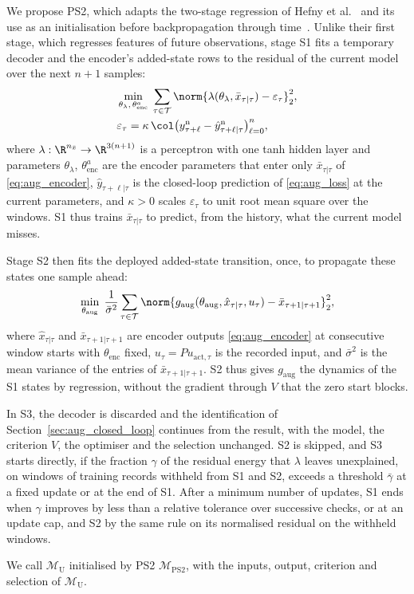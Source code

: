 We propose PS2, which adapts the two-stage regression of Hefny et
al.~\cite[Sec.~3]{hefny2015supervised} and its use as an initialisation before
backpropagation through time~\cite[Sec.~4.2]{downey2017psrnn}.
Unlike their first stage, which regresses features of future observations,
stage S1 fits a temporary decoder and the encoder's added-state rows to the
residual of the current model over the next $n+1$ samples:
\begin{equation}
\begin{aligned}
 &\min_{\theta_\lambda,\,\theta^{a}_{\mathrm{enc}}}\;
 \sum_{\tau\in\mathcal T}
 \norm{\lambda(\theta_\lambda,\bar x_{\tau|\tau})-\varepsilon_\tau}_2^2,\\
 &\varepsilon_\tau=\kappa\,\col\bigl(y^{\mathrm n}_{\tau+\ell}-\hat y^{\mathrm n}_{\tau+\ell|\tau}\bigr)_{\ell=0}^{n},
\end{aligned}
\label{eq:ps2_s1}
\end{equation}
where $\lambda:\R^{n_{\bar x}}\to\R^{3(n+1)}$ is a perceptron with one tanh
hidden layer and parameters $\theta_\lambda$, $\theta^{a}_{\mathrm{enc}}$ are
the encoder parameters that enter only $\bar x_{\tau|\tau}$ of
\eqref{eq:aug_encoder}, $\hat y_{\tau+\ell|\tau}$ is the closed-loop prediction
of \eqref{eq:aug_loss} at the current parameters, and $\kappa>0$ scales
$\varepsilon_\tau$ to unit root mean square over the windows.
S1 thus trains $\bar x_{\tau|\tau}$ to predict, from the history, what the
current model misses.

Stage S2 then fits the deployed added-state transition, once, to propagate
these states one sample ahead:
\begin{equation}
 \min_{\theta_{\mathrm{aug}}}\;\frac{1}{\bar\sigma^2}\sum_{\tau\in\mathcal T}
 \norm{g_{\mathrm{aug}}(\theta_{\mathrm{aug}},\hat x_{\tau|\tau},u_\tau)
 -\bar x_{\tau+1|\tau+1}}_2^2,
 \label{eq:ps2_s2}
\end{equation}
where $\hat x_{\tau|\tau}$ and $\bar x_{\tau+1|\tau+1}$ are encoder outputs
\eqref{eq:aug_encoder} at consecutive window starts with $\theta_{\mathrm{enc}}$
fixed, $u_\tau=Pu_{\mathrm{act},\tau}$ is the recorded input, and
$\bar\sigma^2$ is the mean variance of the entries of
$\bar x_{\tau+1|\tau+1}$.
S2 thus gives $g_{\mathrm{aug}}$ the dynamics of the S1 states by regression,
without the gradient through $V$ that the zero start blocks.

In S3, the decoder is discarded and the identification of
Section~\ref{sec:aug_closed_loop} continues from the result, with the model,
the criterion $V$, the optimiser and the selection unchanged.
S2 is skipped, and S3 starts directly, if the fraction $\gamma$ of the residual
energy that $\lambda$ leaves unexplained, on windows of training records
withheld from S1 and S2, exceeds a threshold $\bar\gamma$ at a fixed update or
at the end of S1.
After a minimum number of updates, S1 ends when $\gamma$ improves by less than a
relative tolerance over successive checks, or at an update cap, and S2 by the
same rule on its normalised residual on the withheld windows.

We call $\mathcal M_{\mathrm U}$ initialised by PS2 $\mathcal M_{\mathrm{PS2}}$,
with the inputs, output, criterion and selection of $\mathcal M_{\mathrm U}$.
